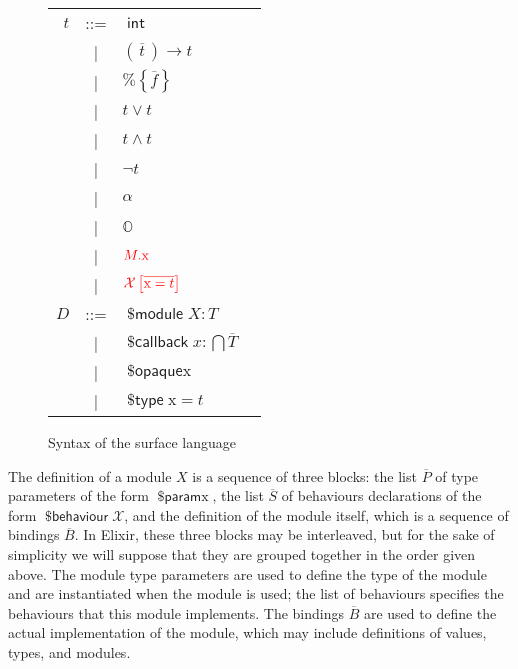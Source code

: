 \documentclass[a4paper,10pt]{article}
\DeclareMathOperator{\kwbvr}{\textsf{\$behaviour}}
\DeclareMathOperator{\kwprm}{\textsf{\$param}}
\DeclareMathOperator{\kwopq}{\textsf{\$opaque}}
\DeclareMathOperator{\kwtp}{\textsf{\$type}}
\DeclareMathOperator{\kwmdl}{\textsf{\$module}}
\DeclareMathOperator{\kwclbk}{\textsf{\$callback}}
\DeclareMathOperator{\kwint}{\textsf{int}}
\newcommand{\tx}{\textrm{x}}
\begin{document}
\begin{figure}
\begin{tabular}{r c ll}
    $t$ & ::= & $\kwint$ \\
    & | & $(\overline{\,t\,})\rightarrow t$\\
    & | & $\texttt{\%}\!\left\{\overline{f}\right\}$ \\
    & | & $t\vee t$ \\
    & | & $t\wedge t$ \\
    & | & $\neg t$\\
    & | & $\alpha$ \\
    & | & $\mathbb{O}$ \\
    & | & $\textcolor{red}{M.\tx}$ \\
    & | & $\textcolor{red}{\mathcal{X}\left[\overline{\tx=t}\right]}$ \\
    $D$ & ::= & $\kwmdl X : T$ \\
    & | & $\kwclbk x : \bigcap \overline{T}$ \\
    & | & $\kwopq \tx$ \\
    & | & $\kwtp \tx = t$
  \end{tabular}
  \caption{Syntax of the surface language}\label{fig:surfacesyntax}
\end{figure}


The definition of a module $X$ is a sequence of three blocks: the list $\overline P$ of type parameters of the form $\kwprm \tx$, the list $\overline S$ of behaviours declarations of the form  $\kwbvr \mathcal X$, and the definition of the module itself, which is a sequence of bindings $\overline{B}$. In Elixir, these three blocks may be interleaved, but for the sake of simplicity we will suppose that they are grouped together in the order given above. The module type parameters are used to define the type of the module and are instantiated when the module is used; the list of behaviours specifies the behaviours that this module implements. The bindings $\overline{B}$ are used to define the actual implementation of the module, which may include definitions of values, types, and modules.
\end{document}
